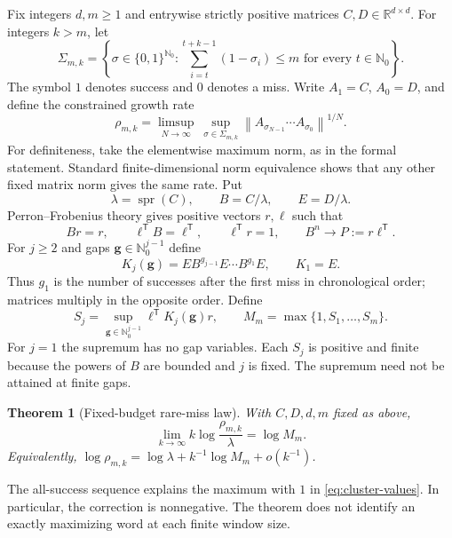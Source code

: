 \documentclass[11pt,letterpaper]{article}
\newtheorem{theorem}{Theorem}
\theoremstyle{remark}
\newcommand{\R}{\mathbb R}
\newcommand{\Nzero}{\mathbb N_0}
\newcommand{\transpose}{^{\mathsf T}}
\DeclareMathOperator{\spr}{spr}
\begin{document}
Fix integers $d,m\ge1$ and entrywise strictly positive matrices
$C,D\in\R^{d\times d}$. For integers $k>m$, let
\[
 \Sigma_{m,k}=\left\{\sigma\in\{0,1\}^{\Nzero}:
  \sum_{i=t}^{t+k-1}(1-\sigma_i)\le m
  \text{ for every }t\in\Nzero\right\}.
\]
The symbol $1$ denotes success and $0$ denotes a miss. Write $A_1=C$,
$A_0=D$, and define the constrained growth rate
\begin{equation}\label{eq:rate}
 \rho_{m,k}=\limsup_{N\to\infty}\ 
 \sup_{\sigma\in\Sigma_{m,k}}
 \left\|A_{\sigma_{N-1}}\cdots A_{\sigma_0}\right\|^{1/N}.
\end{equation}
For definiteness, take the elementwise maximum norm, as in the formal
statement. Standard finite-dimensional norm equivalence shows that any
other fixed matrix norm gives the same rate. Put
\[
 \lambda=\spr(C),\qquad B=C/\lambda,\qquad E=D/\lambda.
\]
Perron--Frobenius theory gives positive vectors $r,\ell$ such that
\begin{equation}\label{eq:perron}
 Br=r,\qquad \ell\transpose B=\ell\transpose,\qquad
 \ell\transpose r=1,\qquad B^n\longrightarrow P:=r\ell\transpose.
\end{equation}
For $j\ge2$ and gaps $\boldsymbol g\in\Nzero^{j-1}$ define
\[
 K_j(\boldsymbol g)
  =E B^{g_{j-1}}E\cdots B^{g_1}E,\qquad K_1=E.
\]
Thus $g_1$ is the number of successes after the first miss in chronological
order; matrices multiply in the opposite order. Define
\begin{equation}\label{eq:cluster-values}
 S_j=\sup_{\boldsymbol g\in\Nzero^{j-1}}
       \ell\transpose K_j(\boldsymbol g)r,\qquad
 M_m=\max\{1,S_1,\ldots,S_m\}.
\end{equation}
For $j=1$ the supremum has no gap variables. Each $S_j$ is positive and
finite because the powers of $B$ are bounded and $j$ is fixed.
The supremum need not be attained at finite gaps.

\begin{theorem}[Fixed-budget rare-miss law]\label{thm:main}
With $C,D,d,m$ fixed as above,
\begin{equation}\label{eq:main}
 \lim_{k\to\infty}k\log\frac{\rho_{m,k}}{\lambda}=\log M_m.
\end{equation}
Equivalently, $\log\rho_{m,k}=\log\lambda+k^{-1}\log M_m+o(k^{-1})$.
\end{theorem}

The all-success sequence explains the maximum with $1$ in
\eqref{eq:cluster-values}. In particular, the correction is nonnegative.
The theorem does not identify an exactly maximizing word at each finite
window size.
\end{document}
